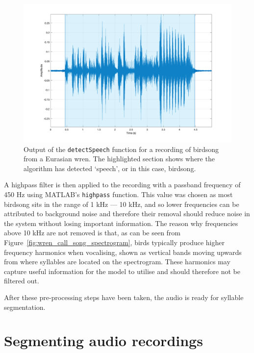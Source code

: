 \begin{figure}[ht]
  \centering
  \includegraphics[width=\textwidth]{figures/detected_speech.png}
  \caption{Output of the \texttt{detectSpeech} function for a recording of
  birdsong from a Eurasian wren. The highlighted section shows where the
algorithm has detected `speech', or in this case,
birdsong.}\label{fig:detected_speech}
\end{figure}

A highpass filter is then applied to the recording with a passband frequency of
450 Hz using MATLAB's \texttt{highpass} function. This value was chosen
as most birdsong sits in the range of 1 kHz --- 10 kHz, and so lower frequencies
can be attributed to background noise and therefore their removal should reduce
noise in the system without losing important information. The reason why
frequencies above 10 kHz are not removed is that, as can be seen from
Figure~\ref{fig:wren_call_song_spectrogram}, birds typically produce higher
frequency harmonics when vocalising, shown as vertical bands moving upwards from
where syllables are located on the spectrogram. These harmonics may capture
useful information for the model to utilise and should therefore not be filtered
out.

After these pre-processing steps have been taken, the audio is ready for
syllable segmentation.

\section{Segmenting audio recordings}\label{sec:segmentation}

